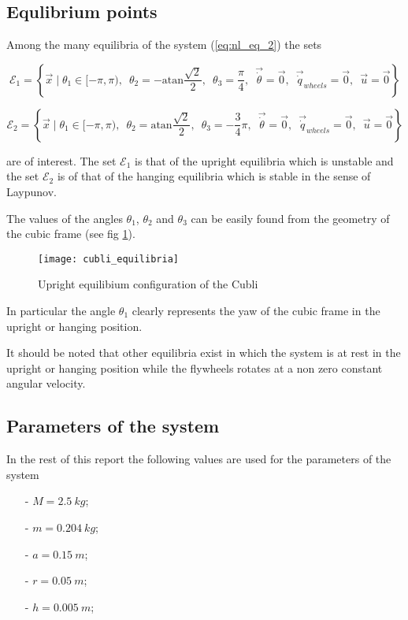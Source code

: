 \subsection{Equlibrium points}
Among the many equilibria of the system (\ref{eq:nl_eq_2}) the sets
\begin{small}
  \[
  \mathcal{E}_{1} = \left\{ \vec{x} \mid \theta_1 \in [-\pi, \pi),\enspace \theta_2 = -\mathrm{atan}\frac{\sqrt{2}}{2},\enspace
    \theta_3 = \frac{\pi}{4},\enspace
    \vec{\dot{\theta}} = \vec{0},\enspace
    \vec{\dot{q}}_{wheels} = \vec{0},\enspace
    \vec{u} = \vec{0}
    \right\}
    \]
\end{small}
\begin{small}
  \[
  \mathcal{E}_{2} = \left\{
  \vec{x} \mid \theta_1 \in [-\pi, \pi),\enspace
    \theta_2 = \mathrm{atan}\frac{\sqrt{2}}{2},\enspace
    \theta_3 = -\frac{3}{4} \pi,\enspace
    \vec{\dot{\theta}} = \vec{0},\enspace
      \vec{\dot{q}}_{wheels} = \vec{0},\enspace
      \vec{u} = \vec{0}
      \right\}
      \]
\end{small}
are of interest. The set $\mathcal{E}_{1}$ is that of the upright
equilibria which is unstable and the set $\mathcal{E}_{2}$ is of that
of the hanging equilibria which is stable in the sense of Laypunov.
\par
The values of the angles $\theta_1$, $\theta_2$ and
$\theta_3$ can be easily found from the geometry of the cubic frame (see fig \ref{fig:cubli_equilibria}).
\begin{figure}[h]
  \centering
  \texttt{[image: cubli\_equilibria]}
  \caption{Upright equilibium configuration of the Cubli\label{fig:cubli_equilibria}}
\end{figure}
In particular the angle $\theta_1$ clearly represents the yaw of the cubic
frame in the upright or hanging position.
\par
It should be noted that other equilibria exist in which the system is
at rest in the upright or hanging position while the flywheels rotates
at a non zero constant angular velocity.

\subsection{Parameters of the system}
In the rest of this report the following values are used for the parameters of the system
\begin{itemize}
  \item[-] $M = \SI{2.5}{kg}$;
  \item[-] $m = \SI{0.204}{kg}$;
  \item[-] $a = \SI{0.15}{m}$;
  \item[-] $r = \SI{0.05}{m}$;
  \item[-] $h = \SI{0.005}{m}$;
\end{itemize}
\newpage
